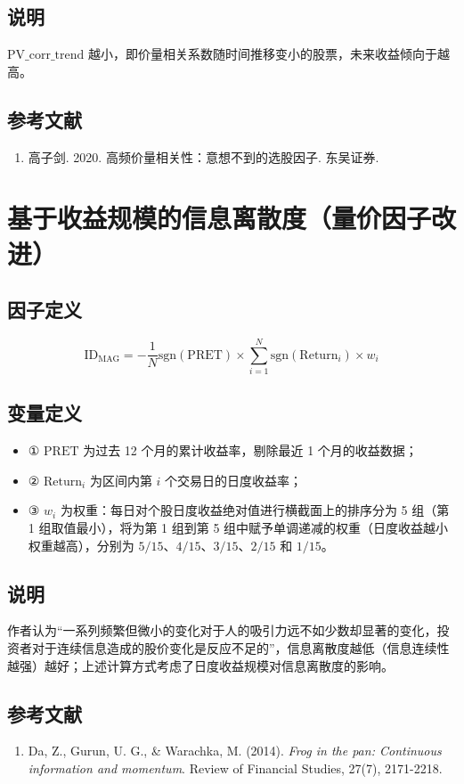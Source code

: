 \documentclass{article}
\begin{document}
\subsection{说明}
\( \mathrm{PV\_corr\_trend} \) 越小，即价量相关系数随时间推移变小的股票，未来收益倾向于越高。

\subsection{参考文献}
\begin{enumerate}
    \item 高子剑. 2020. 高频价量相关性：意想不到的选股因子. 东吴证券.
\end{enumerate}

\section{基于收益规模的信息离散度（量价因子改进）}

\subsection{因子定义}
\begin{equation}
    \mathrm{ID_{MAG}} = -\frac{1}{N} \mathrm{sgn}(\mathrm{PRET}) \times \sum_{i=1}^{N} \mathrm{sgn}(\mathrm{Return}_i) \times w_i
\end{equation}

\subsection{变量定义}
\begin{itemize}
    \item ① \( \mathrm{PRET} \) 为过去 12 个月的累计收益率，剔除最近 1 个月的收益数据；
    \item ② \( \mathrm{Return}_i \) 为区间内第 \( i \) 个交易日的日度收益率；
    \item ③ \( w_i \) 为权重：每日对个股日度收益绝对值进行横截面上的排序分为 5 组（第 1 组取值最小），将为第 1 组到第 5 组中赋予单调递减的权重（日度收益越小权重越高），分别为 \( 5/15 \)、\( 4/15 \)、\( 3/15 \)、\( 2/15 \) 和 \( 1/15 \)。
\end{itemize}

\subsection{说明}
作者认为“一系列频繁但微小的变化对于人的吸引力远不如少数却显著的变化，投资者对于连续信息造成的股价变化是反应不足的”，信息离散度越低（信息连续性越强）越好；上述计算方式考虑了日度收益规模对信息离散度的影响。

\subsection{参考文献}
\begin{enumerate}
    \item Da, Z., Gurun, U. G., \& Warachka, M. (2014). \textit{Frog in the pan: Continuous information and momentum}. Review of Financial Studies, 27(7), 2171-2218.
\end{enumerate}
\end{document}
